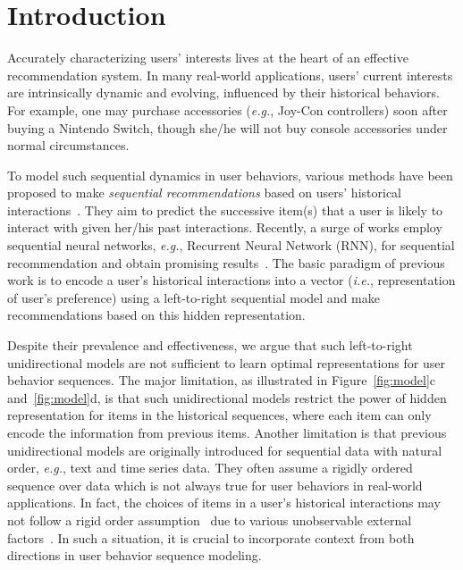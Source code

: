 \section{Introduction}





Accurately characterizing users' interests lives at the heart of an effective recommendation system.
In many real-world applications, users' current interests are intrinsically dynamic and evolving, influenced by their historical behaviors.
For example, one may purchase accessories (\textit{e.g.}, Joy-Con controllers) soon after buying a Nintendo Switch, though she/he will not buy console accessories under normal circumstances.

To model such sequential dynamics in user behaviors, various methods have been proposed to make \textit{sequential recommendations} based on users' historical interactions~\cite{Rendle:WWW2010:FPM,Hidasi:ICLR2016:gru4rec,Kang:ICDM2018:SAS}.
They aim to predict the successive item(s) that a user is likely to interact with given her/his past interactions.
Recently, a surge of works employ sequential neural networks, \textit{e.g.}, Recurrent Neural Network (RNN), for sequential recommendation and obtain promising results~\cite{Hidasi:ICLR2016:gru4rec,Yu:sigir2016:DRM,Wu:wsdm2017:RRN,Donkers:recsys2017:SUR,Hidasi:CIKM2018:RNN}.
The basic paradigm of previous work is to encode a user's historical interactions into a vector (\textit{i.e.}, representation of user's preference) using a left-to-right sequential model and make recommendations based on this hidden representation.





Despite their prevalence and effectiveness, we argue that such left-to-right unidirectional models are not sufficient to learn optimal representations for user behavior sequences. %
The major limitation, as illustrated in Figure~\ref{fig:model}c and~\ref{fig:model}d, is that such unidirectional models restrict the power of hidden representation for items in the historical sequences, where each item can only encode the information from previous items.
Another limitation is that previous unidirectional models are originally introduced for sequential data with natural order, \textit{e.g.}, text and time series data.
They often assume a rigidly ordered sequence over data which is not always true for user behaviors in real-world applications.
In fact, the choices of items in a user's historical interactions may not follow a rigid order assumption~\cite{Hu:ijcai2017:Diversifying,Wang:aaai2018:atem} due to various unobservable external factors~\cite{Covington:recsys2016:DNN}. %
In such a situation, it is crucial to incorporate context from both directions in user behavior sequence modeling.














